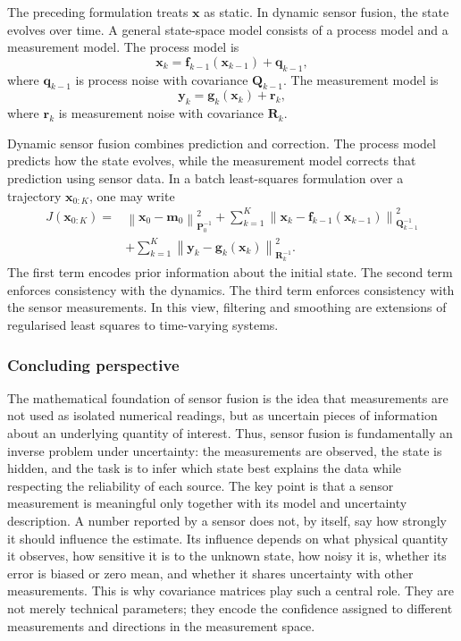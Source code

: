 \documentclass{ieeeaccess}
\begin{document}
The preceding formulation treats $\mathbf{x}$ as static. In dynamic sensor fusion, the state evolves over time. A general state-space model consists of a process model and a measurement model. The process model is
\begin{equation}
\mathbf{x}_k
=
\mathbf{f}_{k-1}
\left(
\mathbf{x}_{k-1}
\right)
+
\mathbf{q}_{k-1},
\end{equation}
where $\mathbf{q}_{k-1}$ is process noise with covariance $\mathbf{Q}_{k-1}$. The measurement model is
\begin{equation}
\mathbf{y}_k
=
\mathbf{g}_k
\left(
\mathbf{x}_k
\right)
+
\mathbf{r}_k,
\end{equation}
where $\mathbf{r}_k$ is measurement noise with covariance $\mathbf{R}_k$.

Dynamic sensor fusion combines prediction and correction. The process model predicts how the state evolves, while the measurement model corrects that prediction using sensor data. In a batch least-squares formulation over a trajectory $\mathbf{x}_{0:K}$, one may write
\begin{align}
J(\mathbf{x}_{0:K})
=&
\left\|
\mathbf{x}_0
-
\mathbf{m}_0
\right\|_{\mathbf{P}_0^{-1}}^2
+
\sum_{k=1}^{K}
\left\|
\mathbf{x}_k
-
\mathbf{f}_{k-1}
\left(
\mathbf{x}_{k-1}
\right)
\right\|_{\mathbf{Q}_{k-1}^{-1}}^2 \nonumber \\
&+
\sum_{k=1}^{K}
\left\|
\mathbf{y}_k
-
\mathbf{g}_k
\left(
\mathbf{x}_k
\right)
\right\|_{\mathbf{R}_k^{-1}}^2.
\end{align}
The first term encodes prior information about the initial state. The second term enforces consistency with the dynamics. The third term enforces consistency with the sensor measurements. In this view, filtering and smoothing are extensions of regularised least squares to time-varying systems.

\subsubsection{Concluding perspective}

The mathematical foundation of sensor fusion is the idea that measurements are not used as isolated numerical readings, but as uncertain pieces of information about an underlying quantity of interest. Thus, sensor fusion is fundamentally an inverse problem under uncertainty: the measurements are observed, the state is hidden, and the task is to infer which state best explains the data while respecting the reliability of each source. The key point is that a sensor measurement is meaningful only together with its model and uncertainty description. A number reported by a sensor does not, by itself, say how strongly it should influence the estimate. Its influence depends on what physical quantity it observes, how sensitive it is to the unknown state, how noisy it is, whether its error is biased or zero mean, and whether it shares uncertainty with other measurements. This is why covariance matrices play such a central role. They are not merely technical parameters; they encode the confidence assigned to different measurements and directions in the measurement space.
\end{document}

